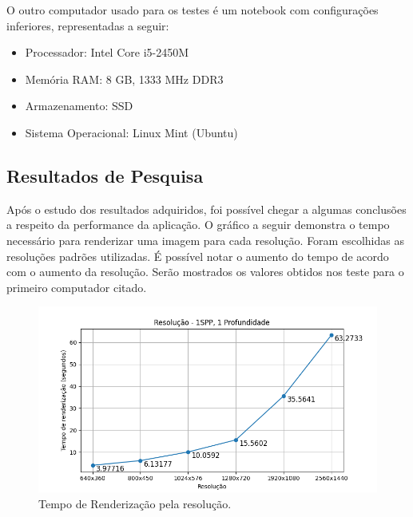 \documentclass[journal]{IEEEtran}
\begin{document}
O outro computador usado para os testes é um notebook com configurações inferiores, representadas a seguir:

\begin{itemize}
  \item Processador: Intel Core i5-2450M
  \item Memória RAM: 8 GB, 1333 MHz DDR3
  \item Armazenamento: SSD 
  \item Sistema Operacional: Linux Mint (Ubuntu)
\end{itemize}


\subsection{Resultados de Pesquisa}
Após o estudo dos resultados adquiridos, foi possível chegar a algumas conclusões a respeito
da performance da aplicação. O gráfico a seguir demonstra o tempo necessário para renderizar
uma imagem para cada resolução. Foram escolhidas as resoluções padrões utilizadas. É possível
notar o aumento do tempo de acordo com o aumento da resolução. Serão mostrados os valores obtidos
nos teste para o primeiro computador citado.

\begin{figure}[ht]
  \centering
  \includegraphics[width=\linewidth]{media/Desktop_RES.png}
  \caption{Tempo de Renderização pela resolução.}
  \label{img_desktop_res}
\end{figure}
\end{document}
